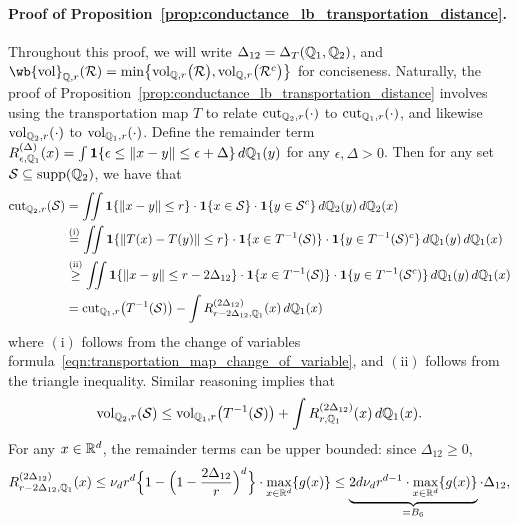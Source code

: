 \paragraph{Proof of Proposition~\ref{prop:conductance_lb_transportation_distance}.}
	Throughout this proof, we will write $\Delta_{12} = \Delta_T(\mathbb{Q}_1,\mathbb{Q}_2)$, and $\wb{\vol}_{\mbb{Q},r}(\mc{R}) = \min\bigl\{\vol_{\mbb{Q},r}\bigl(\mc{R}\bigr),\vol_{\mbb{Q},r}\bigl(\mc{R}^c\bigr)\bigr\}$ for conciseness. Naturally, the proof of Proposition~\ref{prop:conductance_lb_transportation_distance} involves using the transportation map $T$ to relate $\mathrm{cut}_{\mathbb{Q}_2,r}(\cdot)$ to $\mathrm{cut}_{\mathbb{Q}_1,r}(\cdot)$, and likewise $\mathrm{vol}_{\mathbb{Q}_2,r}(\cdot)$ to $\mathrm{vol}_{\mathbb{Q}_1,r}(\cdot)$. Define the remainder term $R_{\epsilon,\mathbb{Q}_1}^{(\Delta)}(x) = \int \mathbf{1}\{\epsilon \leq \|x - y\| \leq \epsilon + \Delta\} \,d\mathbb{Q}_1(y)$ for any $\epsilon, \Delta > 0$. Then for any set $\mathcal{S} \subseteq \mathrm{supp}(\mathbb{Q}_2)$, we have that
	\begin{align}
	\mathrm{cut}_{\mathbb{Q}_2,r}(\mathcal{S}) & = \iint \mathbf{1}\{\|x - y\|\leq r\} \cdot \mathbf{1}\{x \in \mathcal{S} \} \cdot \mathbf{1}\{y \in \mathcal{S}^c \} \,d\mathbb{Q}_2(y) \,d\mathbb{Q}_2(x) \nonumber \\ 
	& \overset{\mathrm{(i)}}{=} \iint \mathbf{1}\{\|T(x) - T(y)\|\leq r\} \cdot \mathbf{1}\{x \in T^{-1}(\mathcal{S}) \} \cdot \mathbf{1}\{y \in T^{-1}(\mathcal{S})^c \} \,d\mathbb{Q}_1(y) \,d\mathbb{Q}_1(x) \nonumber \\
	& \overset{\mathrm{(ii)}}{\geq} \iint \mathbf{1}\{\|x - y\|\leq r - 2\Delta_{12}\} \cdot \mathbf{1}\{x \in T^{-1}(\mathcal{S}) \} \cdot \mathbf{1}\{y \in T^{-1}(\mathcal{S}^c) \} \,d\mathbb{Q}_1(y) \,d\mathbb{Q}_1(x) \nonumber \\
	& = \mathrm{cut}_{\mathbb{Q}_1,r}\bigl(T^{-1}(\mathcal{S})\bigr) - \int R_{r - 2\Delta_{12} ,\mathbb{Q}_1}^{(2\Delta_{12})}(x) \,d\mathbb{Q}_1(x) \label{pf:conductance_lb_transportation_distance_1}
	\end{align} 
	where $\mathrm{(i)}$ follows from the change of variables formula~\eqref{eqn:transportation_map_change_of_variable}, and $\mathrm{(ii)}$ follows from the triangle inequality. Similar reasoning implies that
	\begin{equation}
	\label{pf:conductance_lb_transportation_distance_2}
	\mathrm{vol}_{\mathbb{Q}_2,r}(\mathcal{S}) \leq \mathrm{vol}_{\mathbb{Q}_1,r}\bigl(T^{-1}(\mathcal{S})\bigr) + \int R_{r,\mathbb{Q}_1}^{(2\Delta_{12})}(x)  \,d\mathbb{Q}_1(x).
	\end{equation}
	For any $x \in \mathbb{R}^d$, the remainder terms can be upper bounded: since $\Delta_{12} \geq 0$,
	\begin{equation*}
	R_{r - 2\Delta_{12} ,\mathbb{Q}_1}^{(2\Delta_{12})}(x) \leq \nu_dr^d\Bigl\{1 - \Bigl(1 - \frac{2\Delta_{12}}{r}\Bigr)^d \Bigr\} \cdot \max_{x \in \mathbb{R}^d}\{g(x)\} \leq \underbrace{2 d \nu_d r^{d - 1} \cdot \max_{x \in \mathbb{R}^d}\{g(x)\}}_{= B_6} \cdot \Delta_{12},
	\end{equation*}
